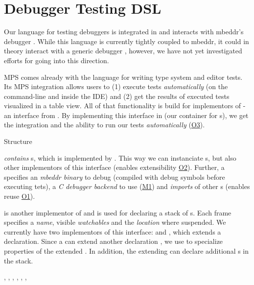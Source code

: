 \section{Debugger Testing DSL}

Our language for testing debuggers is integrated in  and interacts
with mbeddr's debugger . While this language is currently tightly
coupled to mbeddr, it could in theory interact with a generic debugger ,
however, we have not yet investigated efforts for going into this direction.


\ac{MPS} comes already with the language  for writing type
system and editor tests.
Its \ac{MPS} integration allows users to (1) execute tests \emph{automatically}
(on the command-line and inside the \ac{IDE}) and (2) get the results of
executed tests visualized in a table view. All of that functionality is build for implementors
of  - an interface from . By implementing this
interface in  (our container for
s), we get the  integration and the ability to
run our tests \emph{automatically} (\hyperref[O3]{O3}).

Structure

 \emph{contains} s, which is
implemented by . This way we can instanciate
s, but also other implementors of this interface
(enables extensibility \hyperref[O2]{O2}). Further, a 
specifies an \emph{mbeddr binary} to debug (compiled with debug symbols before
executing tets), a \emph{C debugger backend} to use (\hyperref[M1]{M1}) and
\emph{imports} of other s (enables reuse \hyperref[O1]{O1}).

 is another implementor of 
and is used for declaring a stack of s. Each frame specifies a
\emph{name}, visible \emph{watchables} and the \emph{location} where suspended.
We currently have two implementors of this interface: 
and , which extends a declaration. 
Since a  can extend another declaration
, we use  to specialize properties of
the extended . In addition, the extending
 can declare additional s in
the stack. 

, , 
, , 
, , 


